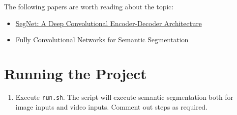 \documentclass{article}
\begin{document}
The following papers are worth reading about the topic:
\begin{itemize}
   \item \href{https://arxiv.org/pdf/1511.00561}{SegNet: A Deep Convolutional Encoder-Decoder Architecture}
   \item \href{https://people.eecs.berkeley.edu/~jonlong/long_shelhamer_fcn.pdf}{Fully Convolutional Networks for Semantic Segmentation}
\end{itemize}

\section{Running the Project}
\begin{enumerate}
\item Execute \texttt{run.sh}. The script will execute semantic segmentation both for image inputs and video inputs. Comment out steps as required.
    \end{enumerate}
\end{document}

